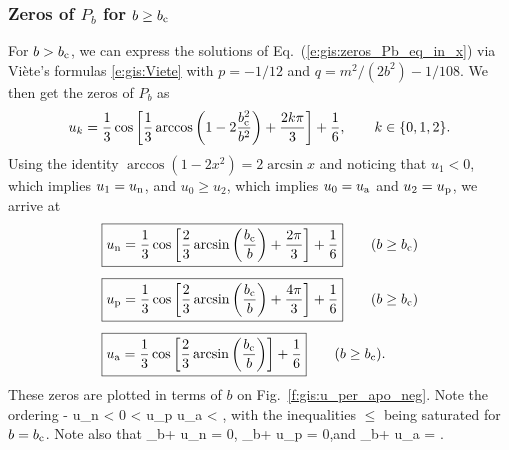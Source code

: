 \subsubsection{Zeros of $P_b$ for $b\geq b_{\rm c}$}

For $b>b_{\rm c}$, we can express the solutions of Eq.~(\ref{e:gis:zeros_Pb_eq_in_x})
via Viète's formulas \eqref{e:gis:Viete}
with $p = -1/12$ and $q = m^2/(2b^2) - 1/108$.
We then get the zeros of $P_b$ as
\[
    u_k = \frac{1}{3} \cos \left[ \frac{1}{3}
        \arccos \left( 1 - 2 \frac{b_{\rm c}^2}{b^2} \right) + \frac{2 k \pi}{3} \right]
        + \frac{1}{6},
        \qquad k \in \{0, 1, 2\} .
\]
Using the identity $\arccos(1 - 2 x^2) = 2\arcsin x$ and noticing
that $u_1 < 0$, which implies $u_1 = u_{\rm n}$, and $u_ 0 \geq u_2$, which
implies $u_0 = u_{\rm a}$ and $u_2 = u_{\rm p}$,
we arrive at
\begin{subequations}
\label{e:gis:zeros_Pbu}
\begin{align}
  &  \fbox{$\displaystyle u_{\rm n} = \frac{1}{3}\cos\left[ \frac{2}{3} \arcsin\left(
   \frac{b_{\rm c}}{b}\right) + \frac{2\pi}{3}\right] + \frac{1}{6} $} \qquad (b \geq b_{\rm c}) \label{e:gis:u_n_b_gt_bc}\\[1ex]
 & \fbox{$\displaystyle  u_{\rm p} = \frac{1}{3}\cos\left[ \frac{2}{3} \arcsin\left(
   \frac{b_{\rm c}}{b}\right) + \frac{4\pi}{3}\right] + \frac{1}{6} $}
            \qquad (b \geq b_{\rm c}) \label{e:gis:u_per_b}  \\[1ex]
 & \fbox{$\displaystyle  u_{\rm a} = \frac{1}{3}\cos\left[ \frac{2}{3} \arcsin\left(
   \frac{b_{\rm c}}{b}\right) \right] + \frac{1}{6} $}  \qquad (b \geq b_{\rm c}) .
   \label{e:gis:u_apo_b}
\end{align}
\end{subequations}
These zeros are plotted in terms of $b$ on Fig.~\ref{f:gis:u_per_apo_neg}.
Note the ordering
\be \label{e:gis:order_u_zeros}
    - \leq u_{\rm n} < 0 < u_{\rm p} \leq {}
    \leq u_{\rm a} <  ,
\ee
with the inequalities $\leq$ being saturated for $b = b_{\rm c}$.
Note also that
\be \label{e:gis:lim_b_inf_u_zeros}
    \lim_{b\to +\infty} u_{\rm n} = 0,\qquad
    \lim_{b\to +\infty} u_{\rm p} = 0,\qquad\mbox{and}\qquad
    \lim_{b\to +\infty} u_{\rm a} =  .
\ee

